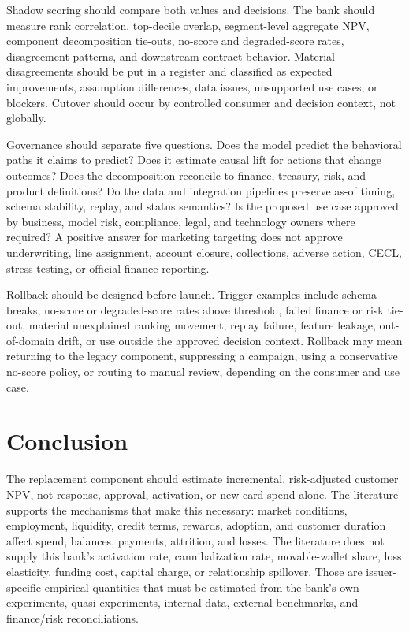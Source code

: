 \documentclass[11pt]{article}
\newcommand{\1}{\mathbf{1}}
\begin{document}
Shadow scoring should compare both values and decisions. The bank should
measure rank correlation, top-decile overlap, segment-level aggregate NPV,
component decomposition tie-outs, no-score and degraded-score rates,
disagreement patterns, and downstream contract behavior. Material
disagreements should be put in a register and classified as expected
improvements, assumption differences, data issues, unsupported use cases, or
blockers. Cutover should occur by controlled consumer and decision context,
not globally.

Governance should separate five questions. Does the model predict the
behavioral paths it claims to predict? Does it estimate causal lift for actions
that change outcomes? Does the decomposition reconcile to finance, treasury,
risk, and product definitions? Do the data and integration pipelines preserve
as-of timing, schema stability, replay, and status semantics? Is the proposed
use case approved by business, model risk, compliance, legal, and technology
owners where required? A positive answer for marketing targeting does not
approve underwriting, line assignment, account closure, collections, adverse
action, CECL, stress testing, or official finance reporting.

Rollback should be designed before launch. Trigger examples include schema
breaks, no-score or degraded-score rates above threshold, failed finance or
risk tie-out, material unexplained ranking movement, replay failure, feature
leakage, out-of-domain drift, or use outside the approved decision context.
Rollback may mean returning to the legacy component, suppressing a campaign,
using a conservative no-score policy, or routing to manual review, depending
on the consumer and use case.

\section{Conclusion}
\label{sec:conclusion}

The replacement component should estimate incremental, risk-adjusted customer
NPV, not response, approval, activation, or new-card spend alone. The
literature supports the mechanisms that make this necessary: market
conditions, employment, liquidity, credit terms, rewards, adoption, and
customer duration affect spend, balances, payments, attrition, and losses. The
literature does not supply this bank's activation rate, cannibalization rate,
movable-wallet share, loss elasticity, funding cost, capital charge, or
relationship spillover. Those are issuer-specific empirical quantities that
must be estimated from the bank's own experiments, quasi-experiments, internal
data, external benchmarks, and finance/risk reconciliations.
\end{document}
